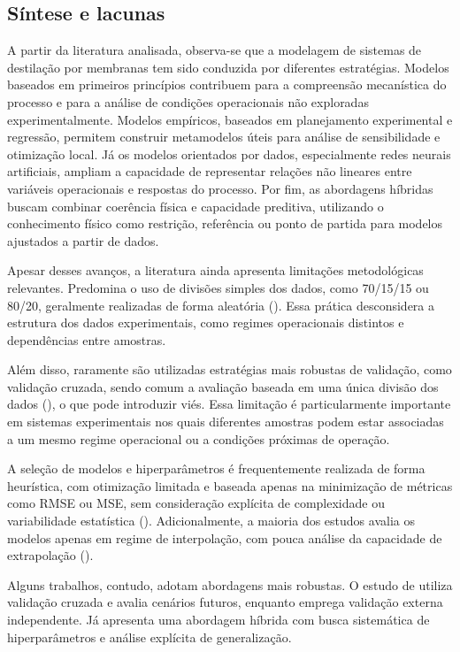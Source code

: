 \subsection{Síntese e lacunas}

A partir da literatura analisada, observa-se que a modelagem de sistemas de destilação por membranas tem sido conduzida por diferentes estratégias. Modelos baseados em primeiros princípios contribuem para a compreensão mecanística do processo e para a análise de condições operacionais não exploradas experimentalmente. Modelos empíricos, baseados em planejamento experimental e regressão, permitem construir metamodelos úteis para análise de sensibilidade e otimização local. Já os modelos orientados por dados, especialmente redes neurais artificiais, ampliam a capacidade de representar relações não lineares entre variáveis operacionais e respostas do processo. Por fim, as abordagens híbridas buscam combinar coerência física e capacidade preditiva, utilizando o conhecimento físico como restrição, referência ou ponto de partida para modelos ajustados a partir de dados.

Apesar desses avanços, a literatura ainda apresenta limitações metodológicas relevantes. Predomina o uso de divisões simples dos dados, como 70/15/15 ou 80/20, geralmente realizadas de forma aleatória (\cite{ANN_VMD_Fouling, ReviewAI_MD}). Essa prática desconsidera a estrutura dos dados experimentais, como regimes operacionais distintos e dependências entre amostras.

Além disso, raramente são utilizadas estratégias mais robustas de validação, como validação cruzada, sendo comum a avaliação baseada em uma única divisão dos dados (\cite{ANN_VMD_Fouling}), o que pode introduzir viés. Essa limitação é particularmente importante em sistemas experimentais nos quais diferentes amostras podem estar associadas a um mesmo regime operacional ou a condições próximas de operação.

A seleção de modelos e hiperparâmetros é frequentemente realizada de forma heurística, com otimização limitada e baseada apenas na minimização de métricas como RMSE ou MSE, sem consideração explícita de complexidade ou variabilidade estatística (\cite{ANN_VMD_Fouling}). Adicionalmente, a maioria dos estudos avalia os modelos apenas em regime de interpolação, com pouca análise da capacidade de extrapolação (\cite{ANN_VMD_Fouling, ReviewAI_MD}).

Alguns trabalhos, contudo, adotam abordagens mais robustas. O estudo de \cite{PINN_MD} utiliza validação cruzada e avalia cenários futuros, enquanto \cite{ANN_AGMD} emprega validação externa independente. Já \cite{Zhou2024} apresenta uma abordagem híbrida com busca sistemática de hiperparâmetros e análise explícita de generalização.

